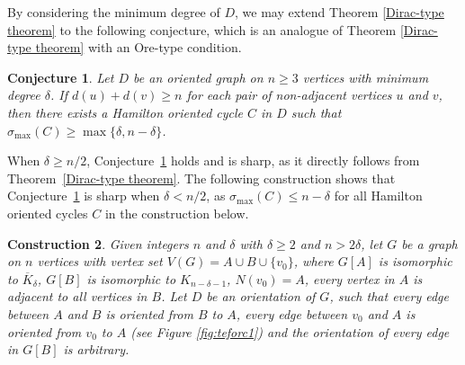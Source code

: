\documentclass[11pt]{article}
\newtheorem{theorem}{Theorem}[section]
\newtheorem{conjecture}[theorem]{Conjecture}
\newtheorem{construction}[theorem]{Construction}
\newcommand{\2}{\vspace{0.2cm}}
\begin{document}
By considering the minimum degree of $D$, we may extend Theorem \ref{Dirac-type theorem} to the following conjecture, which is an analogue of
Theorem \ref{Dirac-type theorem} with an Ore-type condition.






\begin{conjecture}\label{conj:1}
Let $D$ be an oriented graph on $n \ge 3$ vertices with minimum degree $\delta$. If $d(u)+d(v)\ge n$ for each pair of non-adjacent vertices $u$ and $v$, then there exists a Hamilton oriented cycle $C$ in $D$ such that $\sigma_{\max}(C) \ge \max\{\delta,n-\delta\}$.

\end{conjecture}
When $\delta\ge n/2$, Conjecture~\ref{conj:1} holds and is sharp, as it directly follows from Theorem~\ref{Dirac-type theorem}. The following construction shows that Conjecture~\ref{conj:1} is sharp when $\delta < n/2$, as $\sigma_{\max}(C) \leq  n-\delta$ for all Hamilton oriented cycles $C$ in the construction below.

\begin{construction}\label{construct:1}
Given integers $n$ and $\delta$ with $\delta\geq 2 $ and $n>2\delta$, let $G$ be a graph on $n$ vertices with vertex set $V(G)=A\cup B \cup \{v_0\}$, where $G[A]$ is isomorphic to $\overline{K}_{\delta}$, $G[B]$ is isomorphic to $K_{n-\delta-1}$, $N(v_0)=A $, every vertex in $A$ is adjacent to all vertices in $B$. Let $D$ be an orientation of $G$, such that every edge between $A$ and $B$ is oriented from $B$ to $A$, every edge between $v_0$ and $A$ is oriented from $v_0$ to $A$ (see Figure \ref{fig:teforc1}) and the orientation of every edge in $G[B]$ is arbitrary.
\end{construction}
\end{document}
